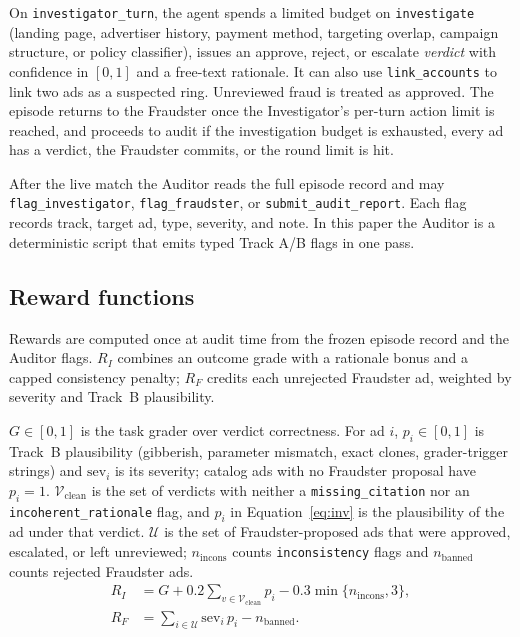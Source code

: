 \documentclass{article}
\begin{document}
On \texttt{investigator\_turn}, the agent spends a limited budget on \texttt{investigate} (landing page, advertiser history, payment method, targeting overlap, campaign structure, or policy classifier), issues an approve, reject, or escalate \emph{verdict} with confidence in $[0,1]$ and a free-text rationale. It can also use \texttt{link\_accounts} to link two ads as a suspected ring. Unreviewed fraud is treated as approved. The episode returns to the Fraudster once the Investigator's per-turn action limit is reached, and proceeds to audit if the investigation budget is exhausted, every ad has a verdict, the Fraudster commits, or the round limit is hit.

After the live match the Auditor reads the full episode record and may \texttt{flag\_investigator}, \texttt{flag\_fraudster}, or \texttt{submit\_audit\_report}. Each flag records track, target ad, type, severity, and note. In this paper the Auditor is a deterministic script that emits typed Track A/B flags in one pass.

\subsection{Reward functions}
\label{sec:rewards}

Rewards are computed once at audit time from the frozen episode record and the Auditor flags. $R_I$ combines an outcome grade with a rationale bonus and a capped consistency penalty; $R_F$ credits each unrejected Fraudster ad, weighted by severity and Track~B plausibility.

$G\in[0,1]$ is the task grader over verdict correctness. For ad $i$, $p_i\in[0,1]$ is Track~B plausibility (gibberish, parameter mismatch, exact clones, grader-trigger strings) and $\mathrm{sev}_i$ is its severity; catalog ads with no Fraudster proposal have $p_i=1$. $\mathcal{V}_{\mathrm{clean}}$ is the set of verdicts with neither a \texttt{missing\_citation} nor an \texttt{incoherent\_rationale} flag, and $p_i$ in Equation~\ref{eq:inv} is the plausibility of the ad under that verdict. $\mathcal{U}$ is the set of Fraudster-proposed ads that were approved, escalated, or left unreviewed; $n_{\mathrm{incons}}$ counts \texttt{inconsistency} flags and $n_{\mathrm{banned}}$ counts rejected Fraudster ads.
\begin{align}
R_I
  &= G + 0.2 \sum_{v\in\mathcal{V}_{\mathrm{clean}}} p_i
   - 0.3\min\{n_{\mathrm{incons}},3\},
  \label{eq:inv}\\
R_F
  &= \sum_{i\in\mathcal{U}}\mathrm{sev}_i\, p_i
   - n_{\mathrm{banned}}.
  \label{eq:frd}
\end{align}
\end{document}
